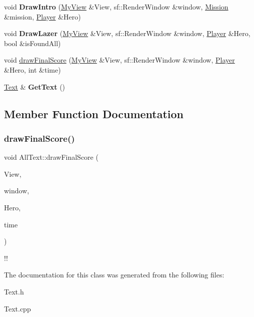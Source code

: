 \begin{DoxyCompactItemize}
void {\bfseries Draw\+Intro} (\hyperlink{class_my_view}{My\+View} \&View, sf\+::\+Render\+Window \&window, \hyperlink{class_mission}{Mission} \&mission, \hyperlink{class_player}{Player} \&Hero)
\item 
\mbox{\label{class_all_text_af28cb614fff0ba72ef5c77ed0bb95902}} 
void {\bfseries Draw\+Lazer} (\hyperlink{class_my_view}{My\+View} \&View, sf\+::\+Render\+Window \&window, \hyperlink{class_player}{Player} \&Hero, bool \&is\+Found\+All)
\item 
void \hyperlink{class_all_text_af992bae6578423015abad86a754809ac}{draw\+Final\+Score} (\hyperlink{class_my_view}{My\+View} \&View, sf\+::\+Render\+Window \&window, \hyperlink{class_player}{Player} \&Hero, int \&time)
\item 
\mbox{\label{class_all_text_a582e0fdce89e1e938c922fc35a6fa7b7}} 
\hyperlink{class_text}{Text} \& {\bfseries Get\+Text} ()
\end{DoxyCompactItemize}


\subsection{Member Function Documentation}
\mbox{\label{class_all_text_af992bae6578423015abad86a754809ac}} 
\subsubsection{\texorpdfstring{draw\+Final\+Score()}{drawFinalScore()}}
{\footnotesize\ttfamily void All\+Text\+::draw\+Final\+Score (\begin{DoxyParamCaption}\item[{\hyperlink{class_my_view}{My\+View} \&}]{View,  }\item[{sf\+::\+Render\+Window \&}]{window,  }\item[{\hyperlink{class_player}{Player} \&}]{Hero,  }\item[{int \&}]{time }\end{DoxyParamCaption})}

!! 

The documentation for this class was generated from the following files\+:\begin{DoxyCompactItemize}
\item 
Text.\+h\item 
Text.\+cpp\end{DoxyCompactItemize}
